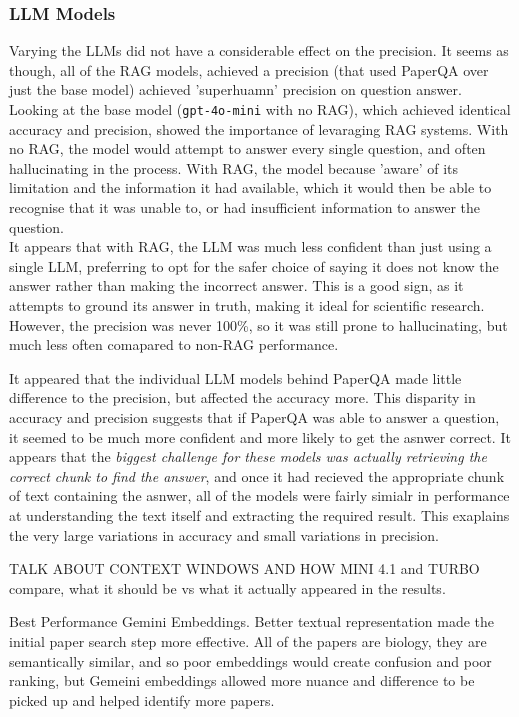 \subsubsection{LLM Models}
Varying the LLMs did not have a considerable effect on the precision. It seems as though, all of the RAG models, achieved a precision (that used PaperQA over just the base model) achieved 'superhuamn' precision on question answer. Looking at the base model (\texttt{gpt-4o-mini} with no RAG), which achieved identical accuracy and precision, showed the importance of levaraging RAG systems. With no RAG, the model would attempt to answer every single question, and often hallucinating in the process. With RAG, the model because 'aware' of its limitation and the information it had available, which it would then be able to recognise that it was unable to, or had insufficient information to answer the question. \\

It appears that with RAG, the LLM was much less confident than just using a single LLM, preferring to opt for the safer choice of saying it does not know the answer rather than making the incorrect answer. This is a good sign, as it attempts to ground its answer in truth, making it ideal for scientific research. However, the precision was never 100\%, so it was still prone to hallucinating, but much less often comapared to non-RAG performance. 

It appeared that the individual LLM models behind PaperQA made little difference to the precision, but affected the accuracy more. This disparity in accuracy and precision suggests that if PaperQA was able to answer a question, it seemed to be much more confident and more likely to get the asnwer correct. It appears that the \textit{biggest challenge for these models was actually retrieving the correct chunk to find the answer}, and once it had recieved the appropriate chunk of text containing the asnwer, all of the models were fairly simialr in performance at understanding the text itself and extracting the required result. This exaplains the very large variations in accuracy and small variations in precision. 

TALK ABOUT CONTEXT WINDOWS AND HOW MINI 4.1 and TURBO compare, what it should be vs what it actually appeared in the results. 

Best Performance Gemini Embeddings. Better textual representation made the initial paper search step more effective. All of the papers are biology, they are semantically similar, and so poor embeddings would create confusion and poor ranking, but Gemeini embeddings allowed more nuance and difference to be picked up and helped identify more papers.



